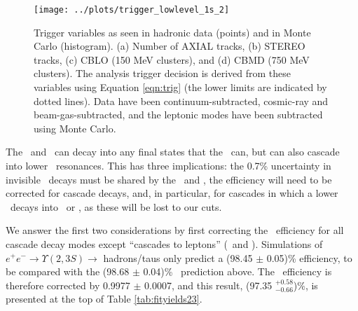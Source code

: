 \documentclass[aps,prd,preprint,superscriptaddress,tightenlines,nofootinbib,floatfix]{revtex4}
\begin{document}
\begin{figure}[p]
  \vspace{3 cm}
  \begin{center}
    \texttt{[image: ../plots/trigger\_lowlevel\_1s\_2]}
  \end{center}
  \caption{\label{fig:mctrig} Trigger variables as seen in hadronic
    data (points) and in Monte Carlo (histogram).  (a) Number of AXIAL
    tracks, (b) STEREO tracks, (c) CBLO (150 MeV clusters), and (d)
    CBMD (750 MeV clusters).  The analysis trigger decision is derived
    from these variables using Equation \ref{eqn:trig} (the lower
    limits are indicated by dotted lines).  Data have been
    continuum-subtracted, cosmic-ray and beam-gas-subtracted, and the
    leptonic modes have been subtracted using Monte Carlo.}
\end{figure}

The \utwo\ and \uthree\ can decay into any final states that the
\uone\ can, but can also cascade into lower \bbar\ resonances.  This
has three implications: the 0.7\% uncertainty in invisible \uone\
decays must be shared by the \utwo\ and \uthree, the efficiency will
need to be corrected for cascade decays, and, in particular, for
cascades in which a lower \ups\ decays into \ee\ or \mm, as these will
be lost to our cuts.

We answer the first two considerations by first correcting the \uone\
efficiency for all cascade decay modes except ``cascades to leptons''
(\ee\ and \mm).  Simulations of $e^+e^- \to \Upsilon(2,3S) \to$
hadrons/taus only predict a (98.45 $\pm$ 0.05)\% efficiency, to be
compared with the (98.68 $\pm$ 0.04)\% \uone\ prediction above.
The \uone\ efficiency is therefore corrected by 0.9977 $\pm$ 0.0007,
and this result, (97.35 $^{+0.58}_{-0.66}$)\%, is presented at the top
of Table \ref{tab:fityields23}.
\end{document}
